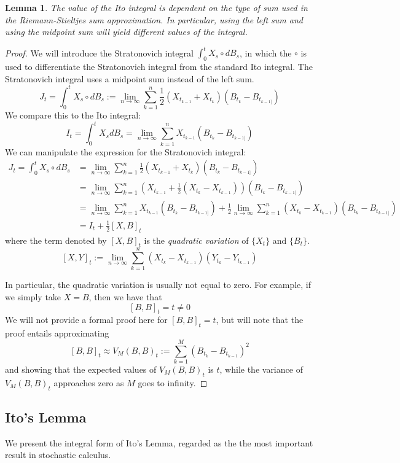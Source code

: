 \documentclass{article}
\newtheorem{lemma}[theorem]{Lemma}
\begin{document}
\begin{lemma}
The value of the Ito integral is dependent on the type of sum used in the Riemann-Stieltjes sum approximation.  In particular, using the left sum and using the midpoint sum will yield different values of the integral.
\end{lemma}
\begin{proof}
We will introduce the Stratonovich integral $\int_0^t X_s \circ dB_s$, in which the $\circ$ is used to differentiate the Stratonovich integral from the standard Ito integral.  The Stratonovich integral uses a midpoint sum instead of the left sum.
$$J_t = \int_0^t X_s \circ dB_s := \lim_{n\to\infty} \sum_{k=1}^n \frac12 (X_{t_{k-1}} + X_{t_k})(B_{t_k} - B_{t_{k-1]}})$$
We compare this to the Ito integral: 
$$I_t = \int_0^t X_s dB_s = \lim_{n\to\infty} \sum_{k=1}^n X_{t_{k-1}}(B_{t_k} - B_{t_{k-1]}})$$
We can manipulate the expression for the Stratonovich integral: 
\begin{align*}
J_t = \int_0^t X_s \circ dB_s &= \lim_{n\to\infty} \sum_{k=1}^n \frac12 (X_{t_{k-1}} + X_{t_k})(B_{t_k} - B_{t_{k-1]}}) \\
&= \lim_{n\to\infty} \sum_{k=1}^n \left( X_{t_{k-1}} + \frac12(X_{t_k} - X_{t_{k-1}}) \right)(B_{t_k} - B_{t_{k-1]}}) \\
&= \lim_{n\to\infty} \sum_{k=1}^n X_{t_{k-1}}(B_{t_k} - B_{t_{k-1]}})
+ \frac12 \lim_{n\to\infty} \sum_{k=1}^n (X_{t_k} - X_{t_{k-1}})(B_{t_k} - B_{t_{k-1]}}) \\
&= I_t + \frac12 [X,B]_t
\end{align*}
where the term denoted by $[X,B]_t$ is the \emph{quadratic variation} of $\{X_t\}$ and $\{B_t\}$.
$$[X,Y]_t := \lim_{n\to\infty} \sum_{k=1}^n (X_{t_k} - X_{t_{k-1}})(Y_{t_k} - Y_{t_{k-1}}) $$

In particular, the quadratic variation is usually not equal to zero.  For example, if we simply take $X=B$, then we have that 
$$[B,B]_t = t \not=0$$
We will not provide a formal proof here for $[B,B]_t = t$, but will note that the proof entails approximating
$$[B,B]_t \approx V_M(B,B)_t:= \sum_{k=1}^M (B_{t_k} - B_{t_{k-1}})^2$$
and showing that the expected values of $V_M(B,B)_t$ is $t$, while the variance of $V_M(B,B)_t$ approaches zero as $M$ goes to infinity. 

\end{proof}

\subsection{Ito's Lemma}
We present the integral form of Ito's Lemma, regarded as the the most important result in stochastic calculus.  
\end{document}
